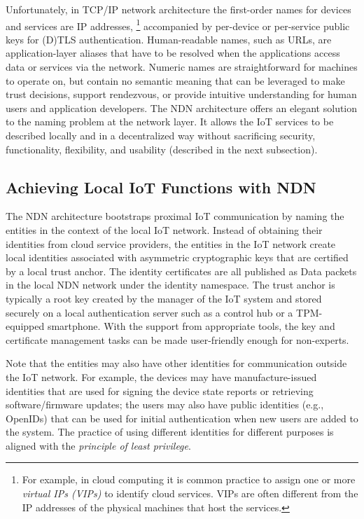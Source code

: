 Unfortunately, in TCP/IP network architecture the first-order names for devices and services are IP addresses,%
\footnote{For example, in cloud computing it is common practice to assign one or more \textit{virtual IPs (VIPs)} to identify cloud services. VIPs are often different from the IP addresses of the physical machines that host the services.}
accompanied by per-device or per-service public keys for (D)TLS authentication.
Human-readable names, such as URLs, are application-layer aliases that have to be resolved when the applications access data or services via the network.
Numeric names are straightforward for machines to operate on, but contain no semantic meaning that can be leveraged to make trust decisions, support rendezvous, or provide intuitive understanding for human users and application developers.
The NDN architecture offers an elegant solution to the naming problem at the network layer. It allows the IoT services to be described locally and in a decentralized way without sacrificing security, functionality, flexibility, and usability (described in the next subsection).

\subsection{Achieving Local IoT Functions with NDN}

The NDN architecture bootstraps proximal IoT communication by naming the entities in the context of the local IoT network.
Instead of obtaining their identities from cloud service providers, the entities in the IoT network create local identities associated with asymmetric cryptographic keys that are certified by a local trust anchor.
The identity certificates are all published as Data packets in the local NDN network under the identity namespace.
The trust anchor is typically a root key created by the manager of the IoT system and stored securely on a local authentication server such as a control hub or a TPM-equipped smartphone.
With the support from appropriate tools, the key and certificate management tasks can be made user-friendly enough for non-experts.

Note that the entities may also have other identities for communication outside the IoT network.
For example, the devices may have manufacture-issued identities that are used for signing the device state reports or retrieving software/firmware updates;
the users may also have public identities (e.g., OpenIDs) that can be used for initial authentication when new users are added to the system.
The practice of using different identities for different purposes is aligned with the \emph{principle of least privilege}.

